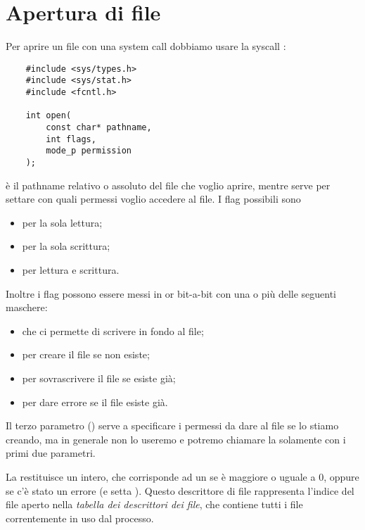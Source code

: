 \section{Apertura di file}

Per aprire un file con una system call dobbiamo usare la syscall :
\begin{verbatim}
    #include <sys/types.h>
    #include <sys/stat.h>
    #include <fcntl.h>

    int open(
        const char* pathname,
        int flags,
        mode_p permission
    );
\end{verbatim}

 è il pathname relativo o assoluto del file che voglio aprire, mentre  serve per settare con quali permessi voglio accedere al file. I flag possibili sono \begin{itemize}
    \item {} per la sola lettura;
    \item {} per la sola scrittura;
    \item {} per lettura e scrittura.
\end{itemize}
Inoltre i flag possono essere messi in or bit-a-bit con una o più delle seguenti maschere: \begin{itemize}
    \item {} che ci permette di scrivere in fondo al file;
    \item {} per creare il file se non esiste;
    \item {} per sovrascrivere il file se esiste già;
    \item {} per dare errore se il file esiste già.
\end{itemize} Il terzo parametro () serve a specificare i permessi da dare al file se lo stiamo creando, ma in generale non lo useremo e potremo chiamare la  solamente con i primi due parametri.

La  restituisce un intero, che corrisponde ad un  se è maggiore o uguale a $0$, oppure  se c'è stato un errore (e setta ). Questo descrittore di file rappresenta l'indice del file aperto nella \emph{tabella dei descrittori dei file}, che contiene tutti i file correntemente in uso dal processo.


